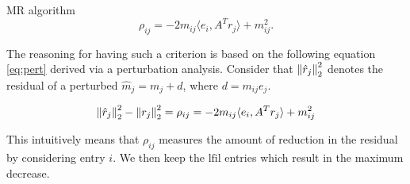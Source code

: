 \documentclass[paper=A4, fontsize=11pt]{scrartcl}
\let\originalleft\left
\let\originalright\right
\renewcommand{\left}{\mathopen{}\mathclose\bgroup\originalleft}
\renewcommand{\right}{\aftergroup\egroup\originalright}
\theoremstyle{remark}
\begin{document}
\begin{section}{MR algorithm}
	\begin{equation}\label{eq:rho}
	\rho_{i j}=-2 m_{i j}\langle e_{i}, A^{T} r_{j}\rangle+m_{i j}^{2}.
	\end{equation}


The reasoning for having such a criterion is based on the following equation \eqref{eq:pert} derived via a perturbation analysis.
Consider that $\left\|\hat{r}_{j}\right\|_{2}^{2}$ denotes the residual of a perturbed $\hat{m}_{j} = m_j + d$, where $d = m_{ij} e_j$.

\begin{equation}\label{eq:pert}
\left\|\hat{r}_{j}\right\|_{2}^{2}-\left\|r_{j}\right\|_{2}^{2}= \rho_{i j} = -2 m_{i j}\langle e_{i}, A^{T} r_{j}\rangle +m_{i j}^{2}
\end{equation}

This intuitively means that $\rho_{i j}$ measures the amount of reduction in the residual by considering entry $i$. We then keep the $\text{lfil}$ entries which result in the maximum decrease.
	
	
\end{section}


\newpage
\end{document}

